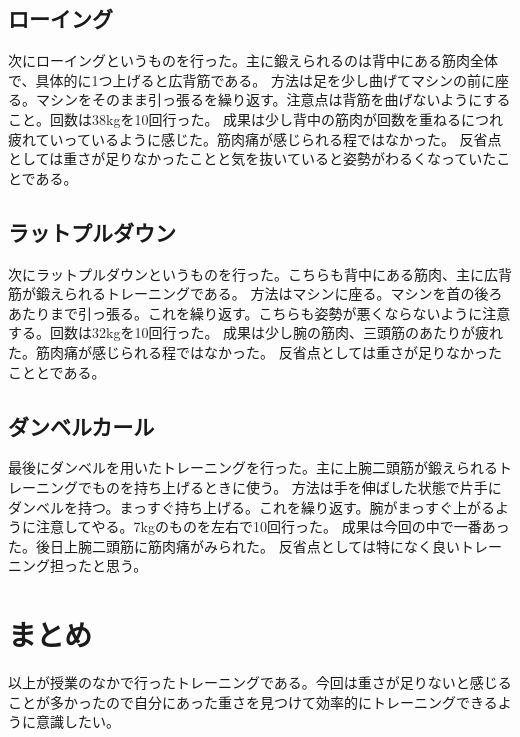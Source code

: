\documentclass[12pt,a4j]{jarticle}
\begin{document}
\subsection{ローイング}
次にローイングというものを行った。主に鍛えられるのは背中にある筋肉全体で、具体的に1つ上げると広背筋である。
方法は足を少し曲げてマシンの前に座る。マシンをそのまま引っ張るを繰り返す。注意点は背筋を曲げないようにすること。回数は38kgを10回行った。
成果は少し背中の筋肉が回数を重ねるにつれ疲れていっているように感じた。筋肉痛が感じられる程ではなかった。
反省点としては重さが足りなかったことと気を抜いていると姿勢がわるくなっていたことである。
\subsection{ラットプルダウン}
次にラットプルダウンというものを行った。こちらも背中にある筋肉、主に広背筋が鍛えられるトレーニングである。
方法はマシンに座る。マシンを首の後ろあたりまで引っ張る。これを繰り返す。こちらも姿勢が悪くならないように注意する。回数は32kgを10回行った。
成果は少し腕の筋肉、三頭筋のあたりが疲れた。筋肉痛が感じられる程ではなかった。
反省点としては重さが足りなかったこととである。
\subsection{ダンベルカール}
最後にダンベルを用いたトレーニングを行った。主に上腕二頭筋が鍛えられるトレーニングでものを持ち上げるときに使う。
方法は手を伸ばした状態で片手にダンベルを持つ。まっすぐ持ち上げる。これを繰り返す。腕がまっすぐ上がるように注意してやる。7kgのものを左右で10回行った。
成果は今回の中で一番あった。後日上腕二頭筋に筋肉痛がみられた。
反省点としては特になく良いトレーニング担ったと思う。
\section{まとめ}
以上が授業のなかで行ったトレーニングである。今回は重さが足りないと感じることが多かったので自分にあった重さを見つけて効率的にトレーニングできるように意識したい。
\end{document}
